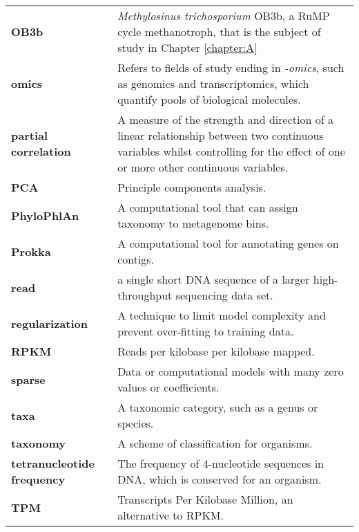 \begin{singlespace}
\begin{longtable}{ p{}  p{} }
\textbf{OB3b} & \textit{Methylosinus trichosporium} {OB3b}, a RuMP cycle methanotroph, that is the subject of study in Chapter \ref{chapter:A}  \\
\textbf{omics} & Refers to fields of study ending in \textit{-omics}, such as genomics and transcriptomics, which quantify pools of biological molecules. \\
\textbf{partial correlation} & A measure of the strength and direction of a linear relationship between two continuous variables whilst controlling for the effect of one or more other continuous variables. \\
\textbf{PCA} & Principle components analysis. \\
\textbf{PhyloPhlAn} & A computational tool that can assign taxonomy to metagenome bins. \\
\textbf{Prokka} & A computational tool for annotating genes on contigs. \\
\textbf{read} & a single short DNA sequence of a larger high-throughput sequencing data set. \\
\textbf{regularization} & A technique to limit model complexity and prevent over-fitting to training data. \\
\textbf{RPKM} & Reads per kilobase per kilobase mapped. \\ %
\textbf{sparse} & Data or computational models with many zero values or coefficients. \\
\textbf{taxa} & A taxonomic category, such as a genus or species. \\
\textbf{taxonomy} & A scheme of classification for organisms. \\
\textbf{tetranucleotide frequency} & The frequency of 4-nucleotide sequences in DNA, which is conserved for an organism. \\
\textbf{TPM} & %
	Transcripts Per Kilobase Million, an alternative to RPKM.

\end{longtable}
\end{singlespace}
